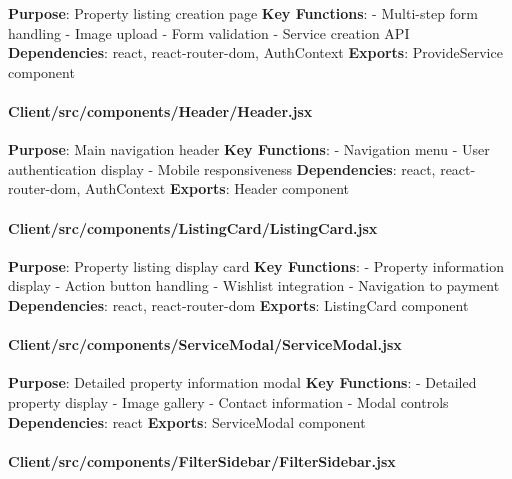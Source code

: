 \documentclass[12pt,a4paper]{article}
\begin{document}
\textbf{Purpose}: Property listing creation page \textbf{Key Functions}:
- Multi-step form handling - Image upload - Form validation - Service
creation API \textbf{Dependencies}: react, react-router-dom, AuthContext
\textbf{Exports}: ProvideService component

\hypertarget{clientsrccomponentsheaderheader.jsx}{%
\paragraph{Client/src/components/Header/Header.jsx}\label{clientsrccomponentsheaderheader.jsx}}

\textbf{Purpose}: Main navigation header \textbf{Key Functions}: -
Navigation menu - User authentication display - Mobile responsiveness
\textbf{Dependencies}: react, react-router-dom, AuthContext
\textbf{Exports}: Header component

\hypertarget{clientsrccomponentslistingcardlistingcard.jsx}{%
\paragraph{Client/src/components/ListingCard/ListingCard.jsx}\label{clientsrccomponentslistingcardlistingcard.jsx}}

\textbf{Purpose}: Property listing display card \textbf{Key Functions}:
- Property information display - Action button handling - Wishlist
integration - Navigation to payment \textbf{Dependencies}: react,
react-router-dom \textbf{Exports}: ListingCard component

\hypertarget{clientsrccomponentsservicemodalservicemodal.jsx}{%
\paragraph{Client/src/components/ServiceModal/ServiceModal.jsx}\label{clientsrccomponentsservicemodalservicemodal.jsx}}

\textbf{Purpose}: Detailed property information modal \textbf{Key
Functions}: - Detailed property display - Image gallery - Contact
information - Modal controls \textbf{Dependencies}: react
\textbf{Exports}: ServiceModal component

\hypertarget{clientsrccomponentsfiltersidebarfiltersidebar.jsx}{%
\paragraph{Client/src/components/FilterSidebar/FilterSidebar.jsx}\label{clientsrccomponentsfiltersidebarfiltersidebar.jsx}}
\end{document}
